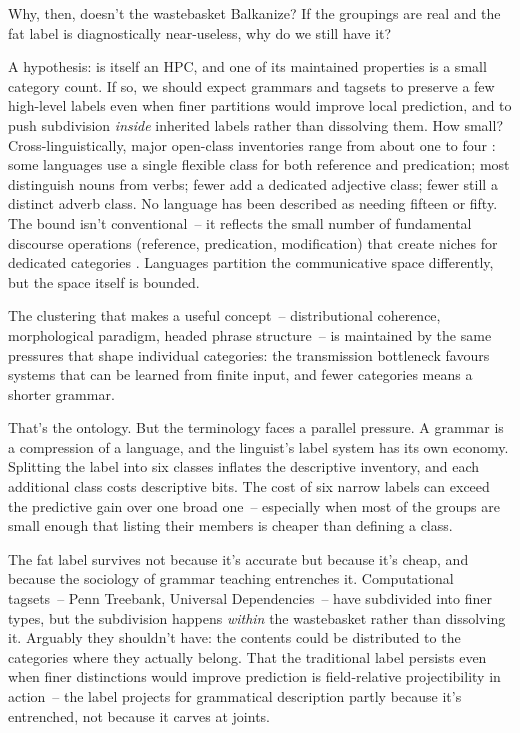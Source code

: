 Why, then, doesn't the wastebasket Balkanize? If the groupings are real and the fat label is diagnostically near-useless, why do we still have it?

A hypothesis:  is itself an HPC, and one of its maintained properties is a small category count. If so, we should expect grammars and tagsets to preserve a few high-level labels even when finer partitions would improve local prediction, and to push subdivision \emph{inside} inherited labels rather than dissolving them. How small? Cross-linguistically, major open-class inventories range from about one to four \citep{rijkhoff2007}: some languages use a single flexible class for both reference and predication; most distinguish nouns from verbs; fewer add a dedicated adjective class; fewer still a distinct adverb class. No language has been described as needing fifteen or fifty. The bound isn't conventional~-- it reflects the small number of fundamental discourse operations (reference, predication, modification) that create niches for dedicated categories \citep{hopperthompson1984, croft2001}. Languages partition the communicative space differently, but the space itself is bounded.

The clustering that makes  a useful concept~-- distributional coherence, morphological paradigm, headed phrase structure~-- is maintained by the same pressures that shape individual categories: the transmission bottleneck favours systems that can be learned from finite input, and fewer categories means a shorter grammar.

That's the ontology. But the terminology faces a parallel pressure. A grammar is a compression of a language, and the linguist's label system has its own economy. Splitting the  label into six classes inflates the descriptive inventory, and each additional class costs descriptive bits. The cost of six narrow labels can exceed the predictive gain over one broad one~-- especially when most of the groups are small enough that listing their members is cheaper than defining a class.

The fat label survives not because it's accurate but because it's cheap, and because the sociology of grammar teaching entrenches it. Computational tagsets~-- Penn Treebank, Universal Dependencies~-- have subdivided  into finer types, but the subdivision happens \emph{within} the wastebasket rather than dissolving it. Arguably they shouldn't have: the contents could be distributed to the categories where they actually belong. That the traditional label persists even when finer distinctions would improve prediction is field-relative projectibility in action~-- the label projects for grammatical description partly because it's entrenched, not because it carves at joints.

